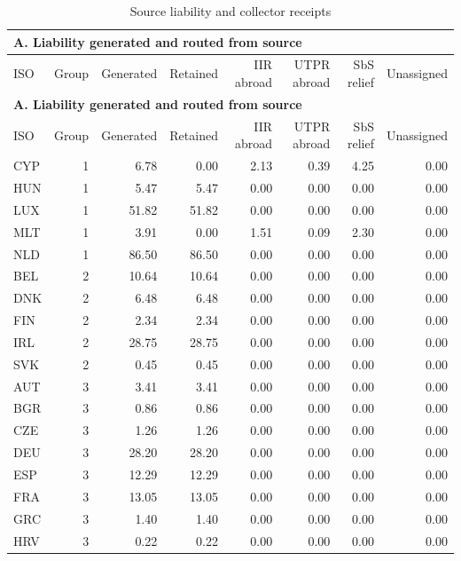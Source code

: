 {\small\setlength{\LTpre}{4pt}\setlength{\LTpost}{4pt}
\begin{longtable}{@{}lrrrrrrr@{}}
\caption{Source liability and collector receipts}\label{tab:tab_v2_source_collector_ledger_and_regimes} \\
\multicolumn{8}{l}{\textbf{A. Liability generated and routed from source}} \\
\toprule
ISO & Group & Generated & Retained & IIR abroad & UTPR abroad & SbS relief & Unassigned \\
\midrule
\endfirsthead
\multicolumn{8}{l}{\textbf{A. Liability generated and routed from source}} \\
\toprule
ISO & Group & Generated & Retained & IIR abroad & UTPR abroad & SbS relief & Unassigned \\
\midrule
\endhead
\midrule
\endfoot
\bottomrule
\endlastfoot
CYP & 1 &  6.78 &  0.00 & 2.13 & 0.39 & 4.25 & 0.00 \\
HUN & 1 &  5.47 &  5.47 & 0.00 & 0.00 & 0.00 & 0.00 \\
LUX & 1 & 51.82 & 51.82 & 0.00 & 0.00 & 0.00 & 0.00 \\
MLT & 1 &  3.91 &  0.00 & 1.51 & 0.09 & 2.30 & 0.00 \\
NLD & 1 & 86.50 & 86.50 & 0.00 & 0.00 & 0.00 & 0.00 \\
BEL & 2 & 10.64 & 10.64 & 0.00 & 0.00 & 0.00 & 0.00 \\
DNK & 2 &  6.48 &  6.48 & 0.00 & 0.00 & 0.00 & 0.00 \\
FIN & 2 &  2.34 &  2.34 & 0.00 & 0.00 & 0.00 & 0.00 \\
IRL & 2 & 28.75 & 28.75 & 0.00 & 0.00 & 0.00 & 0.00 \\
SVK & 2 &  0.45 &  0.45 & 0.00 & 0.00 & 0.00 & 0.00 \\
AUT & 3 &  3.41 &  3.41 & 0.00 & 0.00 & 0.00 & 0.00 \\
BGR & 3 &  0.86 &  0.86 & 0.00 & 0.00 & 0.00 & 0.00 \\
CZE & 3 &  1.26 &  1.26 & 0.00 & 0.00 & 0.00 & 0.00 \\
DEU & 3 & 28.20 & 28.20 & 0.00 & 0.00 & 0.00 & 0.00 \\
ESP & 3 & 12.29 & 12.29 & 0.00 & 0.00 & 0.00 & 0.00 \\
FRA & 3 & 13.05 & 13.05 & 0.00 & 0.00 & 0.00 & 0.00 \\
GRC & 3 &  1.40 &  1.40 & 0.00 & 0.00 & 0.00 & 0.00 \\
HRV & 3 &  0.22 &  0.22 & 0.00 & 0.00 & 0.00 & 0.00 \\

\end{longtable}}
